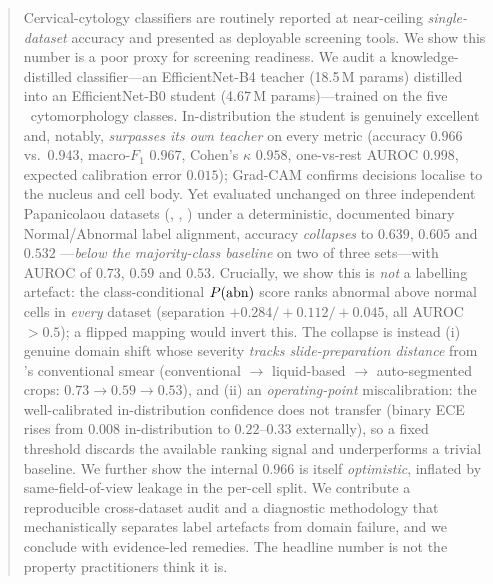 \begin{abstract}
Cervical-cytology classifiers are routinely reported at near-ceiling \emph{single-dataset} accuracy
and presented as deployable screening tools. We show this number is a poor proxy for screening
readiness. We audit a knowledge-distilled classifier---an EfficientNet-B4 teacher (18.5\,M params)
distilled into an EfficientNet-B0 student (4.67\,M params)---trained on the five \sipakmed\
cytomorphology classes. In-distribution the student is genuinely excellent and, notably,
\emph{surpasses its own teacher} on every metric (accuracy $0.966$ vs.\ $0.943$, macro-$F_1$ $0.967$,
Cohen's $\kappa$ $0.958$, one-vs-rest AUROC $0.998$, expected calibration error $0.015$);
Grad-CAM confirms decisions localise to the nucleus and cell body. Yet evaluated unchanged on three
independent Papanicolaou datasets (\herlev, \apacc, \hicervix) under a deterministic, documented
binary Normal/Abnormal label alignment, accuracy \emph{collapses} to $0.639$, $0.605$ and $0.532$
---\emph{below the majority-class baseline} on two of three sets---with AUROC of $0.73$, $0.59$ and
$0.53$. Crucially, we show this is \emph{not} a labelling artefact: the class-conditional
$\pabn$ score ranks abnormal above normal cells in \emph{every} dataset (separation
$+0.284/+0.112/+0.045$, all AUROC$>0.5$); a flipped mapping would invert this. The collapse is instead
(i) genuine domain shift whose severity \emph{tracks slide-preparation distance} from \sipakmed's
conventional smear (conventional $\rightarrow$ liquid-based $\rightarrow$ auto-segmented crops:
$0.73\!\rightarrow\!0.59\!\rightarrow\!0.53$), and (ii) an \emph{operating-point} miscalibration: the
well-calibrated in-distribution confidence does not transfer (binary ECE rises from $0.008$
in-distribution to $0.22$--$0.33$ externally), so a fixed threshold discards the available ranking
signal and underperforms a trivial baseline. We further show the internal
$0.966$ is itself \emph{optimistic}, inflated by same-field-of-view leakage in the per-cell split.
We contribute a reproducible cross-dataset audit and a diagnostic methodology that mechanistically
separates label artefacts from domain failure, and we conclude with evidence-led remedies. The
headline number is not the property practitioners think it is.
\end{abstract}

